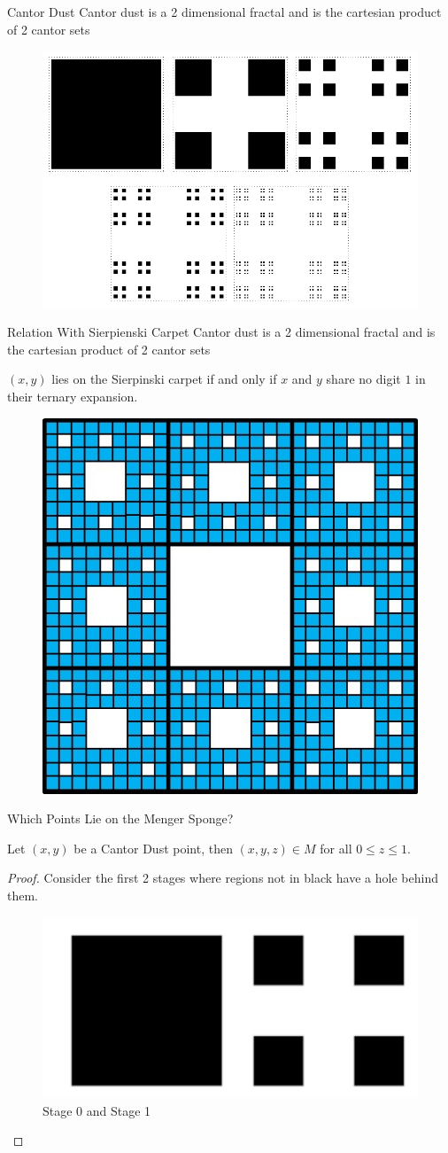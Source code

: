 \begin{frame}{Cantor Dust}
Cantor dust is a 2 dimensional fractal and is the cartesian product of 2 cantor sets
 \begin{figure}
     \centering
     \includegraphics[width=0.5\linewidth]{cantordust.png}
     \caption{\cite{555w}}
     \label{fig:enter-label}
 \end{figure}
\end{frame}

\begin{frame}{Relation With Sierpienski Carpet}
Cantor dust is a 2 dimensional fractal and is the cartesian product of 2 cantor sets
 \begin{lemma}
     $(x,y)$ lies on the Sierpinski carpet if and only if $x$ and $y$ share no digit $1$ in their ternary expansion.
 \end{lemma}
\begin{figure}
    \centering
    \includegraphics[width=0.2\linewidth]{Carpet.jpg}
    \caption{\cite{sierpinski2016}}
    \label{fig:enter-label}
\end{figure}
\end{frame}

\begin{frame}{Which Points Lie on the Menger Sponge?}
\begin{lemma}
    Let $ (x, y)$ be a Cantor Dust point, then $(x,y,z) \in M$ for all $0 \leq z \leq 1$.
\end{lemma}

\begin{proof}
Consider the first 2 stages where regions not in black have a hole behind them. 
    \begin{figure}
        \centering
        \includegraphics[width=0.22\linewidth]{ProofOfPointsOnSponge.png}
        \caption{Stage 0 and Stage 1 \cite{broden2024knotsinsidefractals}}
        \label{fig:enter-label}
    \end{figure}
\end{proof}
\end{frame}

